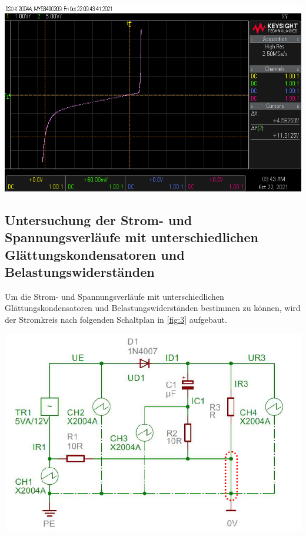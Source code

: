 \documentclass[11pt,ngerman]{scrartcl}
\begin{document}
\begin{center}
	\begin{minipage}[t]{0.8\textwidth}
		\includegraphics[width=\textwidth]{Halbleiter/scope_1}
		\label{fig:oszi2}
	\end{minipage}
\end{center}


\subsection{Untersuchung der Strom- und Spannungsverläufe mit unterschiedlichen Glättungskondensatoren und Belastungswiderständen}

Um die Strom- und Spannungsverläufe mit unterschiedlichen Glättungskondensatoren und Belastungswiderständen bestimmen zu können, wird der Stromkreis nach folgenden Schaltplan in \autoref{fig:3} aufgebaut.

\begin{center}
	\begin{minipage}[t]{0.8\textwidth}
		\includegraphics[width=\textwidth]{skizze_3}
		\label{fig:3}
	\end{minipage}
\end{center}
\end{document}

